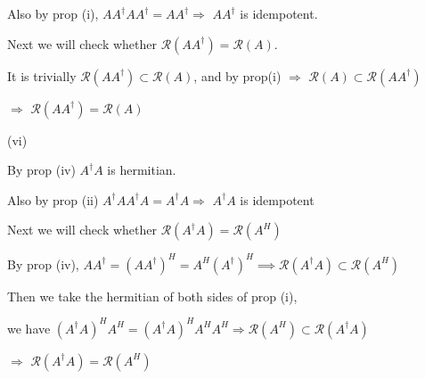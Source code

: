 \documentclass[10pt,letter]{article}
\begin{document}
Also by prop (i), $AA^\dagger A A^\dagger = A A^\dagger \Rightarrow$ $A A^\dagger$ is idempotent.

Next we will check whether $\mathcal{R}(AA^\dagger) = \mathcal{R} (A)$.

It is trivially $\mathcal{R}(A A^\dagger) \subset \mathcal{R}(A)$, and by prop(i) $\Rightarrow$ $ \mathcal{R}(A) \subset \mathcal{R}(A A^\dagger)$

$\Rightarrow$ $\mathcal{R}(AA^\dagger) = \mathcal{R} (A)$

\noindent (vi)

By prop (iv) $A^\dagger A$ is hermitian.

Also by prop (ii) $A^\dagger A A^\dagger A = A^\dagger A \Rightarrow$ $A^\dagger A$ is idempotent

Next we will check whether $\mathcal{R}(A^\dagger A) = \mathcal{R} (A^H)$

By prop (iv),
$AA^\dagger = (AA^\dagger)^H = A^H (A^\dagger)^H \implies \mathcal{R}(A^\dagger A) \subset \mathcal{R} (A^H) $

Then we take the hermitian of both sides of prop (i),

we have $ (A^\dagger A)^H A^H = (A^\dagger A)^H A^H A^H \Rightarrow \mathcal{R} (A^H) \subset \mathcal{R}(A^\dagger A) $

$\Rightarrow$ $\mathcal{R}(A^\dagger A) = \mathcal{R} (A^H)$
\end{document}
